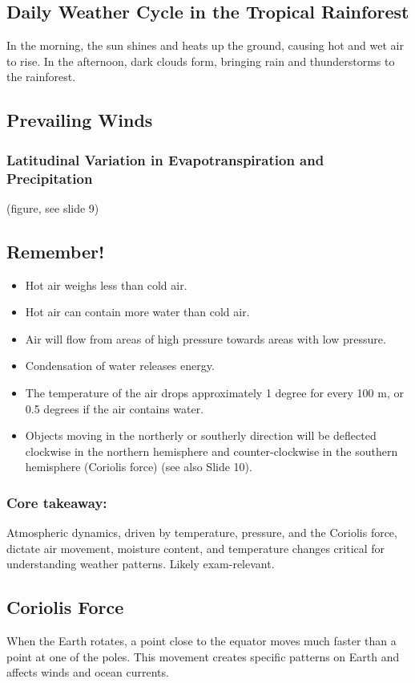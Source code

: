 \subsection{Daily Weather Cycle in the Tropical Rainforest} 
In the morning, the sun shines and heats up the ground, causing hot and wet air to rise. In the afternoon, dark clouds form, bringing rain and thunderstorms to the rainforest.


\subsection{Prevailing Winds} 
\subsubsection{Latitudinal Variation in Evapotranspiration and Precipitation} 
(figure, see slide 9)
\subsection{Remember!} 
\begin{itemize} 
    \item Hot air weighs less than cold air. 
    \item Hot air can contain more water than cold air. 
    \item Air will flow from areas of high pressure towards areas with low pressure. 
    \item Condensation of water releases energy. 
    \item The temperature of the air drops approximately 1 degree for every 100 m, or 0.5 degrees if the air contains water. 
    \item Objects moving in the northerly or southerly direction will be deflected clockwise in the northern hemisphere and counter-clockwise in the southern hemisphere (Coriolis force) (see also Slide 10). 
\end{itemize}

\subsubsection*{Core takeaway:} 
Atmospheric dynamics, driven by temperature, pressure, and the Coriolis force, dictate air movement, moisture content, and temperature changes critical for understanding weather patterns. Likely exam-relevant.


\subsection{Coriolis Force} 
When the Earth rotates, a point close to the equator moves much faster than a point at one of the poles. This movement creates specific patterns on Earth and affects winds and ocean currents.

